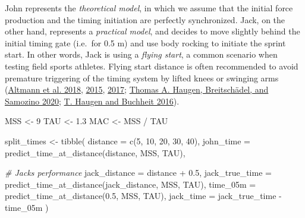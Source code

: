 \documentclass[fleqn,10pt]{wlpeerj} %
\newenvironment{Shaded}{\begin{snugshade}}{\end{snugshade}}
\newcommand{\AttributeTok}[1]{\textcolor[rgb]{0.77,0.63,0.00}{#1}}
\newcommand{\CommentTok}[1]{\textcolor[rgb]{0.56,0.35,0.01}{\textit{#1}}}
\newcommand{\DecValTok}[1]{\textcolor[rgb]{0.00,0.00,0.81}{#1}}
\newcommand{\FloatTok}[1]{\textcolor[rgb]{0.00,0.00,0.81}{#1}}
\newcommand{\FunctionTok}[1]{\textcolor[rgb]{0.00,0.00,0.00}{#1}}
\newcommand{\NormalTok}[1]{#1}
\newcommand{\OtherTok}[1]{\textcolor[rgb]{0.56,0.35,0.01}{#1}}
\newcommand{\SpecialCharTok}[1]{\textcolor[rgb]{0.00,0.00,0.00}{#1}}
\begin{document}
John represents the \emph{theoretical model}, in which we assume that the initial force production and the timing initiation are perfectly synchronized. Jack, on the other hand, represents a \emph{practical model}, and decides to move slightly behind the initial timing gate (i.e.~for 0.5 m) and use body rocking to initiate the sprint start. In other words, Jack is using a \emph{flying start}, a common scenario when testing field sports athletes. Flying start distance is often recommended to avoid premature triggering of the timing system by lifted knees or swinging
arms (\protect\hyperlink{ref-altmannAccuracySingleBeam2018}{Altmann et al. 2018}, \protect\hyperlink{ref-altmannDifferentStartingDistances2015}{2015}, \protect\hyperlink{ref-altmannValiditySingleBeamTiming2017}{2017}; \protect\hyperlink{ref-haugenPowerForceVelocityProfilingSprinting2020}{Thomas A. Haugen, Breitschädel, and Samozino 2020}; \protect\hyperlink{ref-haugenSprintRunningPerformance2016}{T. Haugen and Buchheit 2016}).

\small

\begin{Shaded}
\begin{Highlighting}[]
\NormalTok{MSS }\OtherTok{\textless{}{-}} \DecValTok{9}
\NormalTok{TAU }\OtherTok{\textless{}{-}} \FloatTok{1.3}
\NormalTok{MAC }\OtherTok{\textless{}{-}}\NormalTok{ MSS }\SpecialCharTok{/}\NormalTok{ TAU}

\NormalTok{split\_times }\OtherTok{\textless{}{-}} \FunctionTok{tibble}\NormalTok{(}
  \AttributeTok{distance =} \FunctionTok{c}\NormalTok{(}\DecValTok{5}\NormalTok{, }\DecValTok{10}\NormalTok{, }\DecValTok{20}\NormalTok{, }\DecValTok{30}\NormalTok{, }\DecValTok{40}\NormalTok{),}
  \AttributeTok{john\_time =} \FunctionTok{predict\_time\_at\_distance}\NormalTok{(distance, MSS, TAU),}

  \CommentTok{\# Jack\textquotesingle{}s performance}
  \AttributeTok{jack\_distance =}\NormalTok{ distance }\SpecialCharTok{+} \FloatTok{0.5}\NormalTok{,}
  \AttributeTok{jack\_true\_time =} \FunctionTok{predict\_time\_at\_distance}\NormalTok{(jack\_distance, MSS, TAU),}
  \AttributeTok{time\_05m =} \FunctionTok{predict\_time\_at\_distance}\NormalTok{(}\FloatTok{0.5}\NormalTok{, MSS, TAU),}
  \AttributeTok{jack\_time =}\NormalTok{ jack\_true\_time }\SpecialCharTok{{-}}\NormalTok{ time\_05m}
\NormalTok{)}
\end{Highlighting}
\end{Shaded}

\normalsize
\end{document}
